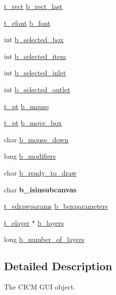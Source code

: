 \begin{DoxyCompactItemize}
\item 
\hyperlink{struct__rect}{t\-\_\-rect} \hyperlink{struct__ebox_a2a0a15d3bc005cd4f815088b230b5ebd}{b\-\_\-rect\-\_\-last}
\item 
\hyperlink{struct__efont}{t\-\_\-efont} \hyperlink{struct__ebox_a4071412a20456f5fcafe2a91cdef11c3}{b\-\_\-font}
\item 
int \hyperlink{struct__ebox_acc1a127070b19ccf6e222d7349c84c96}{b\-\_\-selected\-\_\-box}
\item 
int \hyperlink{struct__ebox_a1f65b6d093e53fd85bed085ce0c5dd8e}{b\-\_\-selected\-\_\-item}
\item 
int \hyperlink{struct__ebox_a0cebb4789c213079e0490e86c10c2893}{b\-\_\-selected\-\_\-inlet}
\item 
int \hyperlink{struct__ebox_acbf0482cb9c6e192e2059775acc1ac86}{b\-\_\-selected\-\_\-outlet}
\item 
\hyperlink{struct__pt}{t\-\_\-pt} \hyperlink{struct__ebox_a8831d355ec1dbb2dca9a68268a977965}{b\-\_\-mouse}
\item 
\hyperlink{struct__pt}{t\-\_\-pt} \hyperlink{struct__ebox_a2b028829ae54f8ccede6bb0d5903f7fd}{b\-\_\-move\-\_\-box}
\item 
char \hyperlink{struct__ebox_a1dc439a4d35e98f78370c81ceadc8ea0}{b\-\_\-mouse\-\_\-down}
\item 
long \hyperlink{struct__ebox_ad230697acdd2d00abb2dc18dd38089d8}{b\-\_\-modifiers}
\item 
char \hyperlink{struct__ebox_a234ea03e103bd45f5fa1d27b8e69b5dd}{b\-\_\-ready\-\_\-to\-\_\-draw}
\item 
\hypertarget{struct__ebox_a4478423a97430b84acbf374f9089f51f}{char {\bfseries b\-\_\-isinsubcanvas}}\label{struct__ebox_a4478423a97430b84acbf374f9089f51f}

\item 
\hyperlink{struct__edrawparams}{t\-\_\-edrawparams} \hyperlink{struct__ebox_a01fa53a36dc717c81755d805a868ad9d}{b\-\_\-boxparameters}
\item 
\hyperlink{struct__elayer}{t\-\_\-elayer} $\ast$ \hyperlink{struct__ebox_ad80949f483467d74761a9e321300d64e}{b\-\_\-layers}
\item 
long \hyperlink{struct__ebox_a84105957ca11a224cf734f350fb23ac9}{b\-\_\-number\-\_\-of\-\_\-layers}
\end{DoxyCompactItemize}


\subsection{Detailed Description}
The C\-I\-C\-M G\-U\-I object. 


